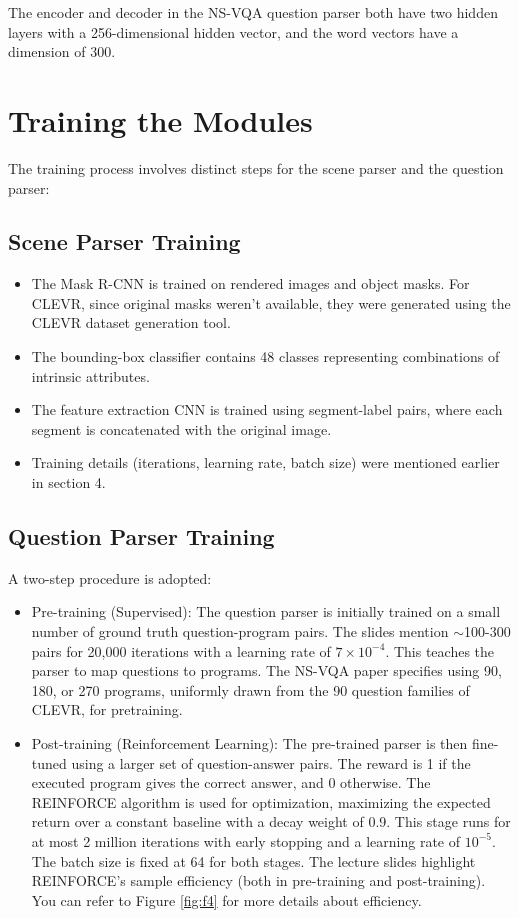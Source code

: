 \documentclass[10pt, oneside]{article}
\begin{document}
The encoder and decoder in the NS-VQA question parser both have two hidden layers with a 256-dimensional hidden vector, and the word vectors have a dimension of 300.

\section{Training the Modules}
The training process involves distinct steps for the scene parser and the question parser:

\subsection{Scene Parser Training}
\begin{itemize}
    \item The Mask R-CNN is trained on rendered images and object masks.  For CLEVR, since original masks weren't available, they were generated using the CLEVR dataset generation tool.
    \item The bounding-box classifier contains 48 classes representing combinations of intrinsic attributes.
    \item The feature extraction CNN is trained using segment-label pairs, where each segment is concatenated with the original image.
    \item Training details (iterations, learning rate, batch size) were mentioned earlier in section 4.
\end{itemize}

\subsection{Question Parser Training}
A two-step procedure is adopted:
\begin{itemize}
    \item Pre-training (Supervised): The question parser is initially trained on a small number of ground truth question-program pairs. The slides mention $\sim$100-300 pairs for 20,000 iterations with a learning rate of $7 \times 10^{-4}$. This teaches the parser to map questions to programs. The NS-VQA paper \cite{Yi2018} specifies using 90, 180, or 270 programs, uniformly drawn from the 90 question families of CLEVR, for pretraining.
    \item Post-training (Reinforcement Learning): The pre-trained parser is then fine-tuned using a larger set of question-answer pairs. The reward is 1 if the executed program gives the correct answer, and 0 otherwise. The REINFORCE algorithm is used for optimization, maximizing the expected return over a constant baseline with a decay weight of 0.9. This stage runs for at most 2 million iterations with early stopping and a learning rate of $10^{-5}$. The batch size is fixed at 64 for both stages. The lecture slides highlight REINFORCE's sample efficiency (both in pre-training and post-training). You can refer to Figure \ref{fig:f4} for more details about efficiency. 
\end{itemize}
\end{document}
